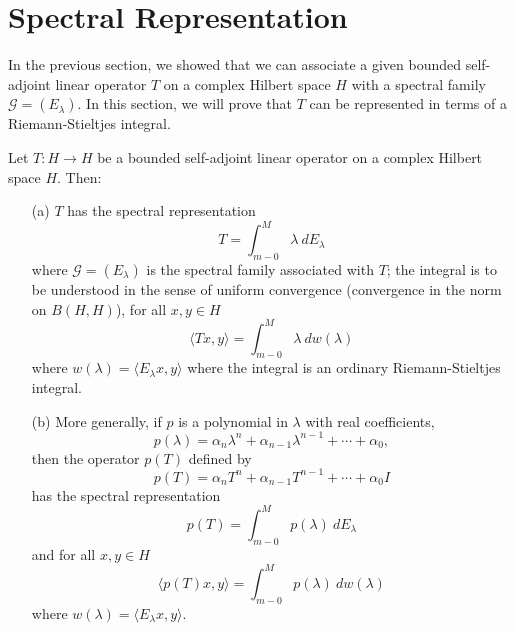 \section{Spectral Representation}

In the previous section, we showed that we can associate a given bounded self-adjoint linear operator \( T  \) on a complex Hilbert space \( H  \) with a spectral family \( \mathcal{G} = ({E}_{\lambda}) \). In this section, we will prove that \( T  \) can be represented in terms of a Riemann-Stieltjes integral. 

\begin{theorem}
    Let \( T : H \to H  \) be a bounded self-adjoint linear operator on a complex Hilbert space \( H  \). Then:
    \begin{enumerate}
        \item[(a)] \( T  \) has the spectral representation 
            \[  T = \int_{ m - 0  }^{ M  }  \lambda  \ d {E}_{\lambda} \tag{1} \]
            where \( \mathcal{G} = ({E}_{\lambda}) \) is the spectral family associated with \( T  \); the integral is to be understood in the sense of uniform convergence (convergence in the norm on \(B(H,H) \)), for all \( x,y \in H \) 
            \[  \langle Tx , y \rangle = \int_{ m - 0  }^{  M  } \lambda  \ d w(\lambda) \tag{1*} \]
            where \( w(\lambda) = \langle {E}_{\lambda} x  ,  y  \rangle  \) where the integral is an ordinary Riemann-Stieltjes integral. 
        \item[(b)] More generally, if \( p  \) is a polynomial in \( \lambda  \) with real coefficients,
            \[ p(\lambda) = {\alpha}_{n} \lambda^{n} + {\alpha}_{n-1} \lambda^{n-1} + \cdots  + {\alpha}_{0}, \]
            then the operator \( p(T) \) defined by  
            \[  p(T)  = {\alpha}_{n} T^{n} + {\alpha}_{n-1} T^{n-1} + \cdots + {\alpha}_{0} I \]
            has the spectral representation 
            \[  p(T) = \int_{ m - 0  }^{ M  }  p(\lambda) \ d {E}_{\lambda} \tag{2} \]
            and for all \( x,y \in H  \) 
            \[  \langle p(T) x  , y  \rangle = \int_{ m - 0  }^{  M  }  p(\lambda)  \ d w(\lambda) \tag{2*} \]
            where \( w(\lambda) = \langle {E}_{\lambda}x  , y \rangle \).
    \end{enumerate}
\end{theorem}



